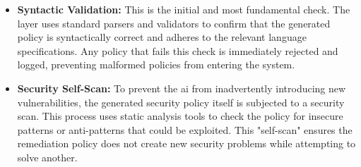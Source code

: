 \begin{itemize}
    \item \textbf{Syntactic Validation:} This is the initial and most fundamental check. The layer uses standard parsers and validators to confirm that the generated policy is syntactically correct and adheres to the relevant language specifications. Any policy that fails this check is immediately rejected and logged, preventing malformed policies from entering the system.
    \item \textbf{Security Self-Scan:} To prevent the \gls{ai} from inadvertently introducing new vulnerabilities, the generated security policy itself is subjected to a security scan. This process uses static analysis tools to check the policy for insecure patterns or anti-patterns that could be exploited. This "self-scan" ensures the remediation policy does not create new security problems while attempting to solve another.
\end{itemize}

